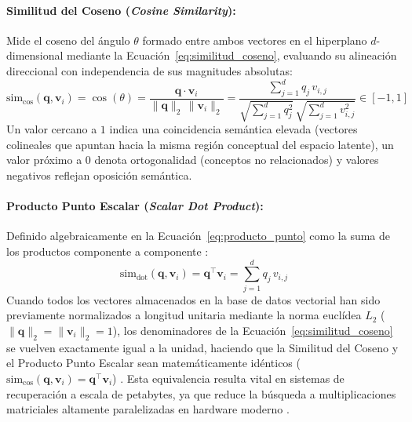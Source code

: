 \paragraph{Similitud del Coseno (\textit{Cosine Similarity}):} Mide el coseno del ángulo $\theta$ formado entre ambos vectores en el hiperplano $d$-dimensional mediante la Ecuación~\eqref{eq:similitud_coseno}, evaluando su alineación direccional con independencia de sus magnitudes absolutas:
\begin{equation}
\text{sim}_{\cos}(\mathbf{q}, \mathbf{v}_i) = \cos(\theta) = \frac{\mathbf{q} \cdot \mathbf{v}_i}{\|\mathbf{q}\|_2 \, \|\mathbf{v}_i\|_2} = \frac{\sum_{j=1}^{d} q_j \, v_{i,j}}{\sqrt{\sum_{j=1}^{d} q_j^2} \, \sqrt{\sum_{j=1}^{d} v_{i,j}^2}} \in [-1, 1]
\label{eq:similitud_coseno}
\end{equation}
Un valor cercano a $1$ indica una coincidencia semántica elevada (vectores colineales que apuntan hacia la misma región conceptual del espacio latente), un valor próximo a $0$ denota ortogonalidad (conceptos no relacionados) y valores negativos reflejan oposición semántica.

\paragraph{Producto Punto Escalar (\textit{Scalar Dot Product}):} Definido algebraicamente en la Ecuación~\eqref{eq:producto_punto} como la suma de los productos componente a componente \cite{learnopencv_qwen3}:
\begin{equation}
\text{sim}_{\text{dot}}(\mathbf{q}, \mathbf{v}_i) = \mathbf{q}^\top \mathbf{v}_i = \sum_{j=1}^{d} q_j \, v_{i,j}
\label{eq:producto_punto}
\end{equation}
Cuando todos los vectores almacenados en la base de datos vectorial han sido previamente normalizados a longitud unitaria mediante la norma euclídea $L_2$ ($\|\mathbf{q}\|_2 = \|\mathbf{v}_i\|_2 = 1$), los denominadores de la Ecuación~\eqref{eq:similitud_coseno} se vuelven exactamente igual a la unidad, haciendo que la Similitud del Coseno y el Producto Punto Escalar sean matemáticamente idénticos ($\text{sim}_{\cos}(\mathbf{q}, \mathbf{v}_i) = \mathbf{q}^\top \mathbf{v}_i$) \cite{learnopencv_qwen3}. Esta equivalencia resulta vital en sistemas de recuperación a escala de petabytes, ya que reduce la búsqueda a multiplicaciones matriciales altamente paralelizadas en hardware moderno \cite{learnopencv_qwen3}.

